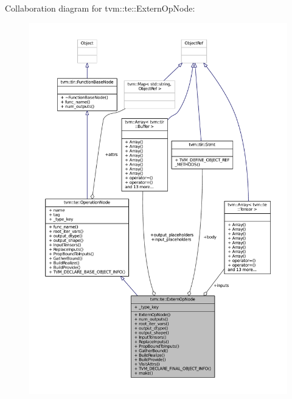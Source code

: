 Collaboration diagram for tvm\+:\+:te\+:\+:Extern\+Op\+Node\+:
\nopagebreak
\begin{figure}[H]
\begin{center}
\leavevmode
\includegraphics[width=350pt]{classtvm_1_1te_1_1ExternOpNode__coll__graph}
\end{center}
\end{figure}
